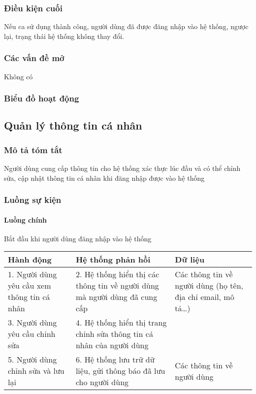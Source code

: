 \documentclass[./../main_file.tex]{subfiles}
\begin{document}
	\subsubsection{Điều kiện cuối}
	Nếu ca sử dụng thành công, người dùng đã được đăng nhập vào hệ thống, ngược lại, trạng thái hệ thống không thay đổi.
	\subsubsection{Các vấn đề mở}
	Không có
	
	\subsubsection{Biểu đồ hoạt động}

\subsection{Quản lý thông tin cá nhân}
\subsubsection{Mô tả tóm tắt}
Người dùng cung cấp thông tin cho hệ thống xác thực lúc đầu và có thể chỉnh sửa, cập nhật thông tin cá nhân khi đăng nhập được vào hệ thống
\subsubsection{Luồng sự kiện}
\paragraph{Luồng chính}
Bắt đầu khi người dùng đăng nhập vào hệ thống
\begin{table}[H]
				\begin{tabular}{|p{.33\textwidth}|p{}|p{}|}
		\hline
		\textbf{Hành động}                 & \textbf{Hệ thống phản hồi}                                            & \textbf{Dữ liệu}            \\ \hline
		1. Người dùng yêu cầu xem thông tin cá nhân &
		2. Hệ thống hiển thị các thông tin về người dùng mà người dùng đã cung cấp &
		Các thông tin về người dùng (họ tên, địa chỉ email, mô tả…) \\ \hline
		3. Người dùng yêu cầu chỉnh sửa    & 4. Hệ thống hiển thị trang chỉnh sửa thông tin cá nhân của người dùng &                             \\ \hline
		5. Người dùng chỉnh sửa và lưu lại & 6. Hệ thống lưu trữ dữ liệu, gửi thông báo đã lưu cho người dùng      & Các thông tin về người dùng \\ \hline
	\end{tabular}
\end{table}
\end{document}
